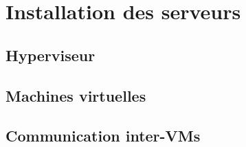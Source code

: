 \section{Installation des serveurs}
	\subsection{Hyperviseur}

	\subsection{Machines virtuelles}

	\subsection{Communication inter-VMs}
